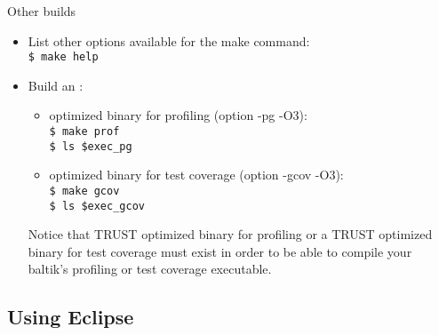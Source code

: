 \documentclass[10pt, hyperref={unicode=true,pdfusetitle, bookmarks=true,bookmarksnumbered=false,bookmarksopen=false, breaklinks=false,pdfborder={0 0 1},backref=true,colorlinks=true,linkcolor=darkblue,pageanchor, urlcolor=darkblue}]{beamer}
\begin{document}
\begin{frame}
\frametitle{}
\begin{block}{Other builds}

\begin{itemize}
\item List other options available for the make command:\\
\texttt{\$ make help}

\item Build an :
\begin{itemize}
\item optimized binary for profiling (option -pg -O3):\\
\texttt{\$ make prof}\\
\texttt{\$ ls \$exec\_pg}

\item optimized binary for test coverage (option -gcov -O3):\\
\texttt{\$ make gcov}\\
\texttt{\$ ls \$exec\_gcov}
\end{itemize}

Notice that TRUST optimized binary for profiling or a TRUST optimized binary for test coverage must exist in order to be able to compile your baltik's profiling or test coverage executable. \\
\end{itemize}

\end{block}
\end{frame}



\subsection{{\bf{Using Eclipse}}}
\begin{frame}
\begin{columns}[c] 
\tableofcontents[sections={1-4},currentsection, currentsubsection]
\tableofcontents[sections={5-10},currentsection, currentsubsection]
\end{columns}
\end{frame}
\end{document}
